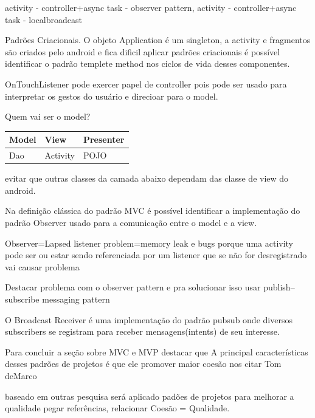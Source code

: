 activity - controller+async task - observer pattern,
activity - controller+async task - localbroadcast

Padrões Criacionais. O objeto Application é um singleton, a activity e
fragmentos são criados pelo android e fica dificil aplicar padrões criacionais é
possível identificar o padrão templete method nos ciclos de vida desses
componentes.



OnTouchListener pode exercer papel de controller pois
pode ser usado para interpretar os gestos do usuário e direcioar para o model.


Quem vai ser o model?

\begin{center}
\begin{tabular}{ | l | l | l | }
  \hline                        
  	Model & View & Presenter \\  \hline
  	Dao & Activity & POJO \\  \hline
\end{tabular}
\end{center}





evitar que outras classes da camada abaixo dependam das classe de view do
android.

Na definição clássica do padrão MVC é possível identificar a implementação do
padrão Observer usado para a comunicação entre o model e a view.



Observer=Lapsed listener problem=memory leak e bugs porque uma activity pode ser
ou estar sendo referenciada por um listener que se não for desregistrado vai
causar problema

Destacar problema com o observer pattern e pra solucionar isso
usar publish–subscribe messaging pattern

O Broadcast Receiver é uma implementação do padrão pubsub onde diversos
subscribers se registram para receber mensagens(intents) de seu interesse.
\fi





 Para concluir a seção sobre MVC e MVP destacar que A principal características
 desses padrões de projetos é que ele promover maior coesão nos citar Tom deMarco 

baseado em outras pesquisa será aplicado padões de projetos  para melhorar a
 qualidade pegar referências,  relacionar Coesão = Qualidade.



